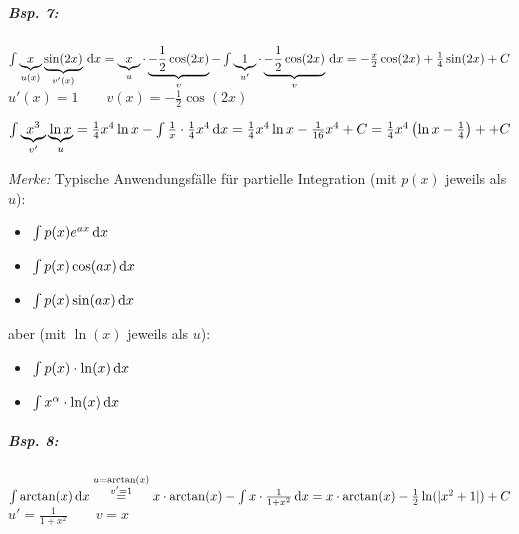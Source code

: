 \subparagraph{Bsp. 7:}
\begin{anumerate}
\item $\int \underbrace{x}_{u(x)} \underbrace{\sin(2x)}_{v'(x)} \,\mathrm{d}x=\underbrace{x}_{u}\cdot \underbrace{-\frac{1}{2}\cos(2x)}_{v} - \int \underbrace{1}_{u'}\cdot \underbrace{-\frac{1}{2}\cos (2x)}_{v}\,\mathrm{d}x=-\frac{x}{2}\cos(2x)+\frac{1}{4}\sin(2x) + C $\\
$u'(x) = 1 \qquad v(x) = -\frac{1}{2}\cos (2x)$
\item $\int \underbrace{x^3}_{v'}\underbrace{\ln x}_{u} = \frac{1}{4}x^4 \ln x - \int \frac{1}{x}\cdot \frac{1}{4}x^4 \,\mathrm{d}x = \frac{1}{4} x^4 \ln x - \frac{1}{16} x^4 + C = \frac{1}{4}x^4 \left(\ln x - \frac{1}{4} \right) ++C$
\end{anumerate}
\emph{Merke:} Typische Anwendungsfälle für partielle Integration (mit $p(x)$ jeweils als $u$):
\begin{itemize}
\item $\int p(x) e^{ax} \,\mathrm{d}x$
\item $\int p(x) \cos (ax) \,\mathrm{d}x$
\item $\int p(x) \sin (ax) \,\mathrm{d}x$
\end{itemize}
aber (mit $\ln(x)$ jeweils als $u$):
\begin{itemize}
\item $\int p(x) \cdot \ln (x) \,\mathrm{d}x$
\item $\int x^\alpha \cdot \ln(x) \,\mathrm{d}x$
\end{itemize}
\subparagraph{Bsp. 8:} \parskp
$\int \arctan (x ) \,\mathrm{d}x \overset{\substack{u=\arctan(x)\\ v'=1}}{=}x \cdot \arctan
(x) - \int x \cdot \frac{1}{1+x^2}\,\mathrm{d}x=x \cdot \arctan (x) - \frac{1}{2}\ln(|x^2+1|)+C$\\
$u'=\frac{1}{1+x^2} \qquad v = x$
